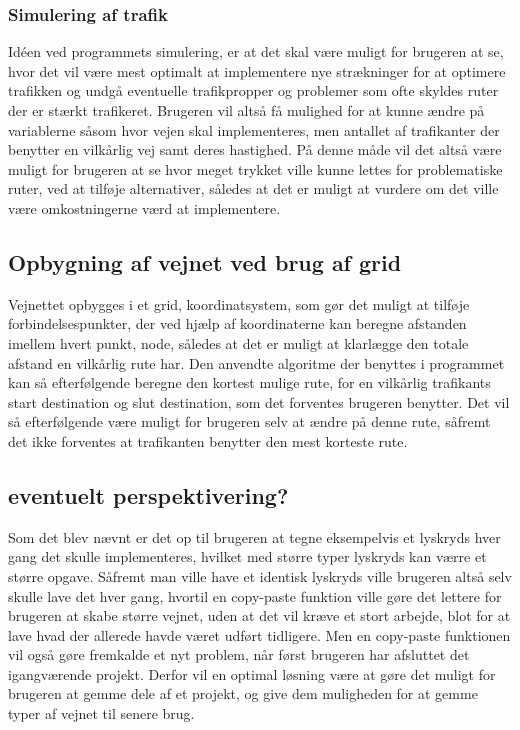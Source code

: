 \subsubsection{Simulering af trafik}
Idéen ved programmets simulering, er at det skal være muligt for brugeren at se, hvor det vil være mest optimalt at implementere nye strækninger for at optimere trafikken og undgå eventuelle trafikpropper og problemer som ofte skyldes ruter der er stærkt trafikeret. Brugeren vil altså få mulighed for at kunne ændre på variablerne såsom hvor vejen skal implementeres, men antallet af trafikanter der benytter en vilkårlig vej samt deres hastighed. På denne måde vil det altså være muligt for brugeren at se hvor meget trykket ville kunne lettes for problematiske ruter, ved at tilføje alternativer, således at det er muligt at vurdere om det ville være omkostningerne værd at implementere. 

\subsection{Opbygning af vejnet ved brug af grid}
Vejnettet opbygges i et grid, koordinatsystem, som gør det muligt at tilføje forbindelsespunkter, der ved hjælp af koordinaterne kan beregne afstanden imellem hvert punkt, node, således at det er muligt at klarlægge den totale afstand en vilkårlig rute har. Den anvendte algoritme der benyttes i programmet kan så efterfølgende beregne den kortest mulige rute, for en vilkårlig trafikants start destination og slut destination, som det forventes brugeren benytter. Det vil så efterfølgende være muligt for brugeren selv at ændre på denne rute, såfremt det ikke forventes at trafikanten benytter den mest korteste rute.

\subsection{eventuelt perspektivering?}
Som det blev nævnt er det op til brugeren at tegne eksempelvis et lyskryds hver gang det skulle implementeres, hvilket med større typer lyskryds kan værre et større opgave. Såfremt man ville have et identisk lyskryds ville brugeren altså selv skulle lave det hver gang, hvortil en copy-paste funktion ville gøre det lettere for brugeren at skabe større vejnet, uden at det vil kræve et stort arbejde, blot for at lave hvad der allerede havde været udført tidligere. Men en copy-paste funktionen vil også gøre fremkalde et nyt problem, når først brugeren har afsluttet det igangværende projekt. Derfor vil en optimal løsning være at gøre det muligt for brugeren at gemme dele af et projekt, og give dem muligheden for at gemme typer af vejnet til senere brug. 